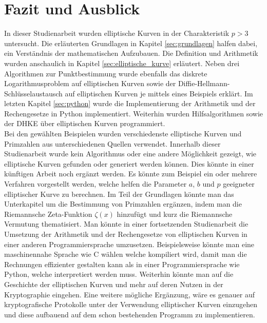\chapter{Fazit und Ausblick}
In dieser Studienarbeit wurden elliptische Kurven in der Charakteristik $p > 3$ untersucht. Die erläuterten Grundlagen in Kapitel \ref{sec:grundlagen} halfen dabei, ein Verständnis der mathematischen Aufzubauen. Die Definition und Arithmetik wurden anschaulich in Kapitel \ref{sec:elliptische_kurve} erläutert. Neben drei Algorithmen zur Punktbestimmung wurde ebenfalls das diskrete Logarithmusproblem auf elliptischen Kurven sowie der Diffie-Hellmann-Schlüsselaustausch auf elliptischen Kurven je mittels eines Beispiels erklärt. Im letzten Kapitel \ref{sec:python} wurde die Implementierung der Arithmetik und der Rechengesetze in Python implementiert. Weiterhin wurden Hilfsalgorithmen sowie der DHKE über elliptischen Kurven programmiert.\\

Bei den gewählten Beispielen wurden verschiedenste elliptische Kurven und Primzahlen aus unterschiedenen Quellen verwendet. Innerhalb dieser Studienarbeit wurde kein Algorithmus oder eine andere Möglichkeit gezeigt, wie elliptische Kurven gefunden oder generiert werden können. Dies könnte in einer künftigen Arbeit noch ergänzt werden. Es könnte zum Beispiel ein oder mehrere Verfahren vorgestellt werden, welche helfen die Parameter $a$, $b$ und $p$ geeigneter elliptischer Kurve zu berechnen. Im Teil der Grundlagen könnte man das Unterkapitel um die Bestimmung von Primzahlen ergänzen, indem man die Riemannsche Zeta-Funktion $\zeta (x)$ hinzufügt und kurz die Riemannsche Vermutung thematisiert. Man könnte in einer fortsetzenden Studienarbeit die Umsetzung der Arithmetik und der Rechengesetze von elliptischen Kurven in einer anderen Programmiersprache umzusetzen. Beispielsweise könnte man eine maschinennahe Sprache wie C wählen welche kompiliert wird, damit man die Rechnungen effizienter gestalten kann als in einer Programmiersprache wie Python, welche interpretiert werden muss. Weiterhin könnte man auf die Geschichte der elliptischen Kurven und mehr auf deren Nutzen in der Kryptographie eingehen. Eine weitere mögliche Ergänzung, wäre es genauer auf kryptografische Protokolle unter der Verwendung elliptischer Kurven einzugehen und diese aufbauend auf dem schon bestehenden Programm zu implementieren.